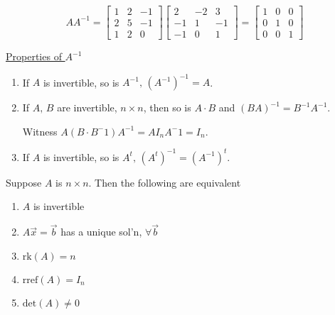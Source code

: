 \documentclass[../main.tex]{subfiles}
\begin{document}
\begin{example}[]
    \[ AA^{-1} =
        \begin{bmatrix}
            1 & 2 & -1 \\
            2 & 5 & -1 \\
            1 & 2 & 0
        \end{bmatrix}
        \begin{bmatrix}
            2 & -2 & 3 \\
            -1 & 1 & -1 \\
            -1 & 0 & 1
        \end{bmatrix}
        = \begin{bmatrix}
            1 & 0 & 0 \\
            0 & 1 & 0 \\
            0 & 0 & 1
        \end{bmatrix}
    \]
\end{example}

\underline{Properties of \( A^{-1} \)}
\begin{enumerate}
    \item If \( A \) is invertible, so is \( A^{-1}, \, \left( A^{-1} \right)^{-1} = A \).
    \item If \( A, \, B \) are invertible, \( n \times n \), then so is \( A \cdot B \) and \( (BA)^{-1} = B^{-1}A^{-1} \).

        Witness \( A \left( B \cdot B^-1 \right)A^{-1} = A I_n A^-1 = I_n \).
    \item If \( A \) is invertible, so is \( A^t, \, \left( A^t \right)^{-1} = \left( A^{-1} \right)^t \).
\end{enumerate}

\begin{theorem}[]
    Suppose \( A \) is \( n \times n \).
    Then the following are equivalent
    \begin{enumerate}
        \item \( A \) is invertible
        \item \( A \vec{x} = \vec{b} \) has a unique sol'n, \( \forall \vec{b} \)
        \item \( \text{rk}(A) = n \)
        \item \( \text{rref}(A) = I_n \)
        \item \( \text{det}(A) \neq 0 \)
    \end{enumerate}
\end{theorem}

\end{document}
